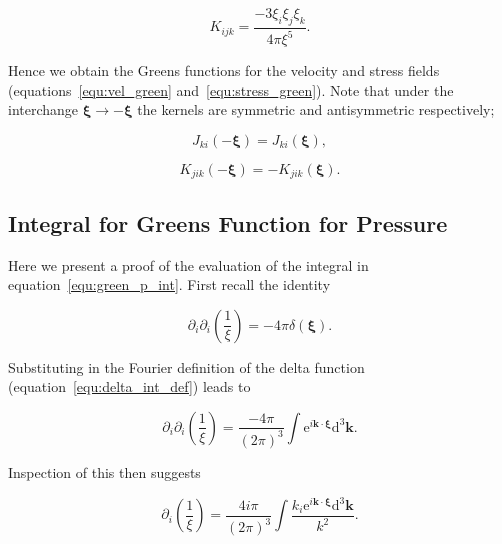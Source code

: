 \documentclass[12pt]{article}
\begin{document}
\begin{equation}
\label{equ:k_kernel}
K_{ijk} = \frac{-3 \xi_{i} \xi_{j} \xi_{k}}{4 \pi \xi^{5}}.
\end{equation}

Hence we obtain the Greens functions for the velocity and stress fields (equations~\ref{equ:vel_green} and~\ref{equ:stress_green}). Note that under the interchange $\boldsymbol\xi \to -\boldsymbol\xi$ the kernels are symmetric and antisymmetric respectively;

\begin{equation}
\label{equ:j_sym}
J_{ki}(-\boldsymbol\xi) = J_{ki}(\boldsymbol\xi),
\end{equation}

\begin{equation}
\label{equ:k_sym}
K_{jik}(-\boldsymbol\xi) = -K_{jik}(\boldsymbol\xi).
\end{equation}


\subsection{Integral for Greens Function for Pressure}
\label{sub_app:green_p}

Here we present a proof of the evaluation of the integral in equation~\ref{equ:green_p_int}. First recall the identity \citep{Jackson99, Frahm82}

\begin{equation}
\label{equ:laplace_recip_squared}
\partial_{i} \partial_{i}\left(\frac{1}{\xi}\right) = -4 \pi \delta(\boldsymbol{\xi}).
\end{equation}


Substituting in the Fourier definition of the delta function (equation~\ref{equ:delta_int_def}) leads to

\begin{equation}
\label{equ:del_square_recip}
\partial_{i} \partial_{i} \left(\frac{1}{\xi}\right) = \frac{-4 \pi}{(2 \pi)^{3}} \int \mathrm{e}^{i \boldsymbol{k} \cdot \boldsymbol{\xi}} \mathrm{d}^{3} \boldsymbol{k} .
\end{equation}

Inspection of this then suggests

\begin{equation}
\label{equ:grad_recip}
\partial_{i} \left(\frac{1}{\xi}\right) = \frac{4 i \pi}{(2 \pi)^{3}} \int \frac{ k_{i} \mathrm{e}^{i \boldsymbol{k} \cdot \boldsymbol{\xi}} \mathrm{d}^{3} \boldsymbol{k}}{k^{2}} .
\end{equation}
\end{document}
